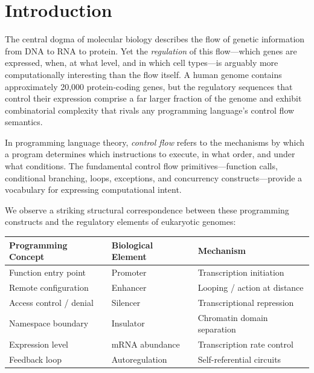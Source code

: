 \documentclass[12pt,a4paper]{article}
\begin{document}
\newpage
\tableofcontents
\newpage

\section{Introduction}\label{sec:introduction}

The central dogma of molecular biology describes the flow of genetic information from DNA to RNA to protein.  Yet the \emph{regulation} of this flow---which genes are expressed, when, at what level, and in which cell types---is arguably more computationally interesting than the flow itself.  A human genome contains approximately 20,000 protein-coding genes, but the regulatory sequences that control their expression comprise a far larger fraction of the genome and exhibit combinatorial complexity that rivals any programming language's control flow semantics.

In programming language theory, \emph{control flow} refers to the mechanisms by which a program determines which instructions to execute, in what order, and under what conditions.  The fundamental control flow primitives---function calls, conditional branching, loops, exceptions, and concurrency constructs---provide a vocabulary for expressing computational intent.

We observe a striking structural correspondence between these programming constructs and the regulatory elements of eukaryotic genomes:

\begin{center}
\begin{tabular}{lll}
\toprule
\textbf{Programming Concept} & \textbf{Biological Element} & \textbf{Mechanism} \\
\midrule
Function entry point & Promoter & Transcription initiation \\
Remote configuration & Enhancer & Looping / action at distance \\
Access control / denial & Silencer & Transcriptional repression \\
Namespace boundary & Insulator & Chromatin domain separation \\
Expression level & mRNA abundance & Transcription rate control \\
Feedback loop & Autoregulation & Self-referential circuits \\
\bottomrule
\end{tabular}
\end{center}
\end{document}
